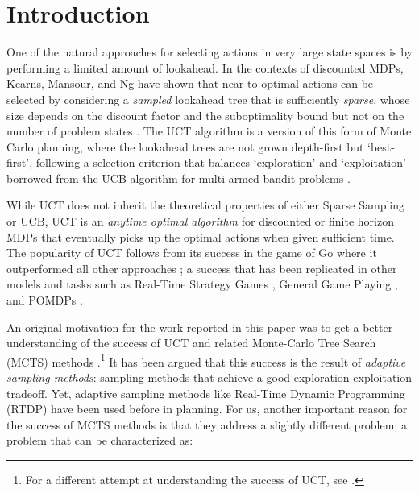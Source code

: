 \documentclass[letterpaper]{article}
\begin{document}
\section{Introduction}

One of the natural approaches for selecting  actions in  very large state spaces
is by performing a limited amount of lookahead. In the contexts of discounted
MDPs, Kearns, Mansour, and Ng have shown  that near to optimal actions can be selected by considering a
\emph{sampled}  lookahead tree that is sufficiently \emph{sparse},   whose size depends on the discount factor
and the suboptimality bound  but not on  the number of problem states \cite{kearns:sparse99}.
The UCT algorithm \cite{uct} is a version of this form of Monte Carlo planning, where the lookahead trees are not grown
depth-first but `best-first',  following a selection criterion that balances `exploration' and `exploitation'
borrowed from the UCB algorithm  for  multi-armed bandit problems \cite{ucb}.

While UCT does not inherit the theoretical properties of either Sparse Sampling or UCB,
UCT is an \emph{anytime optimal algorithm} for discounted or finite horizon MDPs that
eventually picks up the optimal actions when given sufficient time. The popularity of
UCT follows from its success in the game of Go where it outperformed all other approaches \cite{uct:go}; a success that
has been replicated in other models and tasks such as   Real-Time Strategy Games \cite{fern:uct},
General Game Playing \cite{uct:ggp}, and POMDPs \cite{silver:pomdps}.

An original  motivation for the work reported in this paper was to get a better understanding
of  the success of UCT and related Monte-Carlo Tree Search (MCTS) methods \cite{mcts}.\footnote{
For a different attempt at understanding the success of UCT, see \cite{selman:uct}.}
It has been argued that this  success is the result of \emph{adaptive sampling methods}: sampling methods that achieve a good
exploration-exploitation tradeoff. Yet, adaptive sampling methods like  Real-Time Dynamic Programming  (RTDP)  \cite{barto:rtdp}
have been used before in planning. For us,  another important reason  for the success of MCTS  methods is that
they address a slightly different problem; a problem that can be characterized as:
\end{document}
